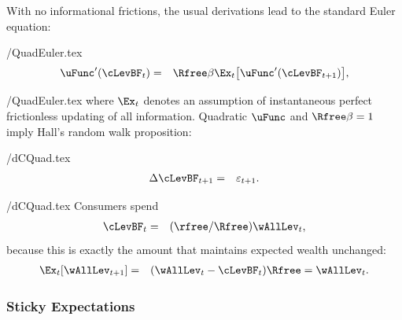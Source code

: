 \documentclass[titlepage]{\econtex}\newcommand{\texname}{cAndCwithStickyE}
\begin{document}
With no informational frictions, the usual derivations lead to the standard Euler equation:
\begin{verbatimwrite}{\eq/QuadEuler.tex}
\begin{eqnarray*}
  \uFunc^{\prime}(\cLevBF_{t}) & = & \Rfree\beta \Ex_{t}\big[\uFunc^{\prime}(\cLevBF_{t+1})\big], \label{eq:QuadEuler}
\end{eqnarray*}
\end{verbatimwrite}
 \eq/QuadEuler.tex
where $\Ex_{t}$ denotes an assumption of instantaneous perfect frictionless updating of all information. Quadratic $\uFunc$ and $\Rfree \beta=1$ imply Hall's random walk proposition:
\begin{verbatimwrite}{\eq/dCQuad.tex}
\begin{eqnarray*}
  \Delta \cLevBF_{t+1} & = & \varepsilon_{t+1} \label{eq:dCQuad}.
\end{eqnarray*}
\end{verbatimwrite}
 \eq/dCQuad.tex
Consumers spend
\begin{eqnarray*}
  \cLevBF_{t} & = & (\rfree/\Rfree) \wAllLev_{t}, \label{eq:cquad}
\end{eqnarray*}
because this is exactly the amount that maintains expected wealth unchanged:
\begin{eqnarray*}
  \Ex_{t}[\wAllLev_{t+1}] & = & (\wAllLev_{t}-\cLevBF_{t})\Rfree = \wAllLev_{t}
.
\end{eqnarray*}


\subsubsection*{Sticky Expectations}
\end{document}
